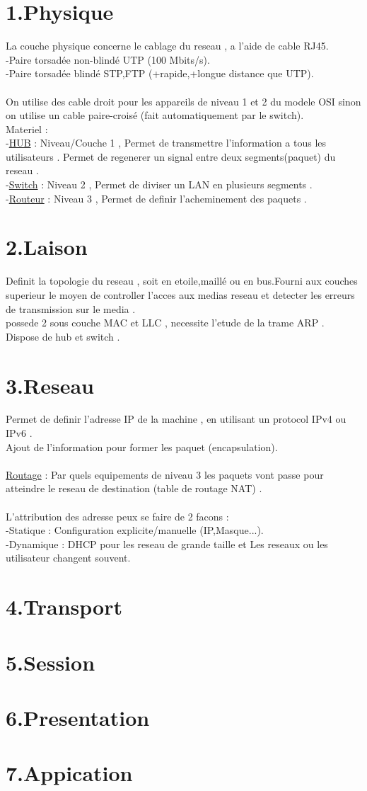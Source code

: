 \documentclass[a4paper,12pt,openany]{book}
\begin{document}
\section{1.Physique}
La couche physique concerne le cablage du reseau , a l'aide de cable RJ45.\\
-Paire torsadée non-blindé UTP (100 Mbits/s).\\
-Paire torsadée blindé STP,FTP (+rapide,+longue distance que UTP).\\
\\
On utilise des cable droit pour les appareils de niveau 1 et 2 du modele OSI sinon on utilise un cable paire-croisé (fait automatiquement par le switch). 
\\
Materiel :\\
-\underline{HUB} : Niveau/Couche 1 , Permet de transmettre l'information a tous les utilisateurs . Permet de regenerer un signal entre deux segments(paquet) du reseau .\\
-\underline{Switch} : Niveau 2 , Permet de diviser un LAN en plusieurs segments .\\
-\underline{Routeur} : Niveau 3 , Permet de definir l'acheminement des paquets .\\


\section{2.Laison}
Definit la topologie du reseau , soit en etoile,maillé ou en bus.Fourni aux couches superieur le moyen de controller l'acces aux medias reseau et detecter les erreurs de transmission sur le media .\\
possede 2 sous couche MAC et LLC , necessite l'etude de la trame ARP .\\
Dispose de hub et switch .\\

\section{3.Reseau}
Permet de definir l'adresse IP de la machine , en utilisant un protocol IPv4 ou IPv6 .\\
Ajout de l'information pour former les paquet (encapsulation).\\
\\
\underline{Routage} : Par quels equipements de niveau 3 les paquets vont passe pour atteindre le reseau de destination (table de routage NAT) .\\
\\
L'attribution des adresse peux se faire de 2 facons :\\
-Statique : Configuration explicite/manuelle (IP,Masque...).\\
-Dynamique : DHCP pour les reseau de grande taille et Les reseaux ou les utilisateur changent souvent.

\section{4.Transport}
\section{5.Session}
\section{6.Presentation}
\section{7.Appication}
\end{document}
